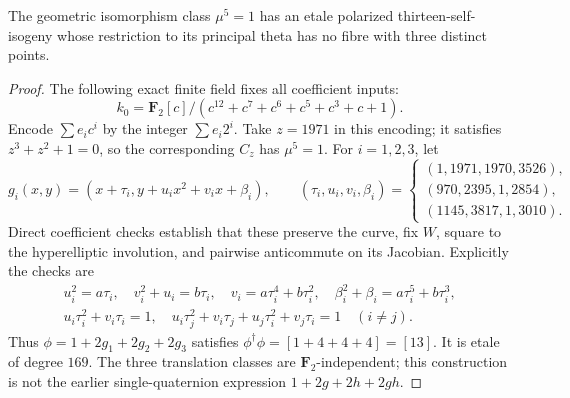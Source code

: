 \begin{lemma}
\label{lem:uniform-thirteen-exceptional-map-candidate}
The geometric isomorphism class $\mu^5=1$ has an etale polarized
thirteen-self-isogeny whose restriction to its principal theta has
no fibre with three distinct points.
\end{lemma}
\begin{proof}
The following exact finite field fixes all coefficient inputs:
\[
 k_0=\mathbf F_2[c]/
 (c^{12}+c^7+c^6+c^5+c^3+c+1).
\tag{T13.10}
\]
Encode $\sum e_ic^i$ by the integer $\sum e_i2^i$.
Take $z=1971$ in this encoding; it satisfies $z^3+z^2+1=0$,
so the corresponding $C_z$ has $\mu^5=1$.
For $i=1,2,3$, let
\[
 g_i(x,y)=(x+\tau_i,y+u_ix^2+v_ix+\beta_i),\qquad
 (\tau_i,u_i,v_i,\beta_i)=
 \begin{cases}
 (1,1971,1970,3526),\\
 (970,2395,1,2854),\\
 (1145,3817,1,3010).
 \end{cases}
\tag{T13.11}
\]
Direct coefficient checks establish that these preserve the curve,
fix $W$, square to the hyperelliptic involution, and pairwise
anticommute on its Jacobian. Explicitly the checks are
\[
\begin{gathered}
 u_i^2=a\tau_i,\quad v_i^2+u_i=b\tau_i,\quad
 v_i=a\tau_i^4+b\tau_i^2,\quad
 \beta_i^2+\beta_i=a\tau_i^5+b\tau_i^3,\\
 u_i\tau_i^2+v_i\tau_i=1,\quad
 u_i\tau_j^2+v_i\tau_j+u_j\tau_i^2+v_j\tau_i=1\quad(i\ne j).
\end{gathered}
\tag{T13.12}
\]
Thus $\phi=1+2g_1+2g_2+2g_3$ satisfies
$\phi^\dagger\phi=[1+4+4+4]=[13]$.
It is etale of degree $169$. The three translation classes are
$\mathbf F_2$-independent; this construction is not the earlier
single-quaternion expression $1+2g+2h+2gh$.


\end{proof}
